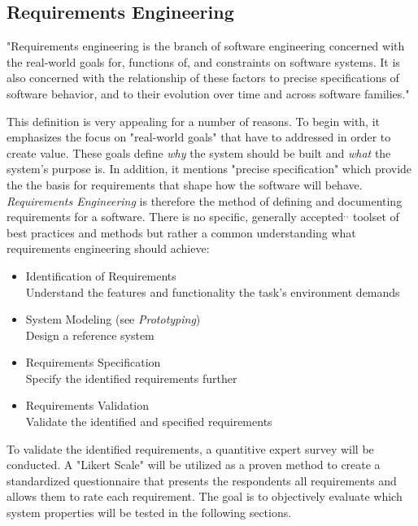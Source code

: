     \subsection{Requirements Engineering}\label{sssec:reqEng}
    "Requirements engineering is the branch of software
    engineering concerned with the real-world goals for,
    functions of, and constraints on software systems. It
    is also concerned with the relationship of these
    factors to precise specifications of software behavior,
    and to their evolution over time and across software
    families."\autocite{Zave1997ClassificationEngineering}
    
    This definition is very appealing for a number of reasons. To begin with, it emphasizes the focus on "real-world goals" that have to addressed in order to create value. These goals define \textit{why} the system should be built and \textit{what} the system's purpose is. In addition, it mentions "precise specification" which provide the the basis for requirements that shape how the software will behave. \textit{Requirements Engineering} is therefore the method of defining and documenting requirements for a software. There is no specific, generally accepted\autocite{Budde1992Prototyping}$^{,}$\autocite{Sommerville1999RequirementsGuide}$^{,}$\autocite{Sommerville2010SoftwareEngineering} toolset of best practices and methods but rather a common understanding what requirements engineering should achieve: 
    \begin{itemize}
        \item Identification of Requirements\\
            Understand the features and functionality the task's environment demands
        \item System Modeling (see \textit{Prototyping})\\
            Design a reference system 
        \item Requirements Specification\\
            Specify the identified requirements further
        \item Requirements Validation\\
            Validate the identified and specified requirements
    \end{itemize}
    
    To validate the identified requirements, a quantitive expert survey will be conducted. A "Likert Scale" \autocite{Likert1932AAttitudes} will be utilized as a proven method to create a standardized questionnaire that presents the respondents all requirements and allows them to rate each requirement. The goal is to objectively evaluate which system properties will be tested in the following sections.
    
